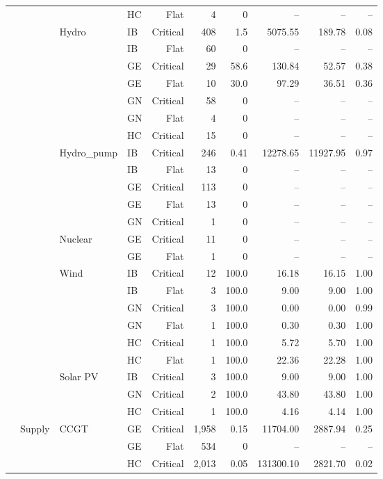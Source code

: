 \begin{longtable}{@{}l l l l r r r r r r@{}}
 &  &  & HC & Flat & 4 & 0 & -- & -- & -- \\
\addlinespace
 &  & Hydro & IB & Critical & 408 & 1.5 & 5075.55 & 189.78 & 0.08 \\
 &  &  & IB & Flat & 60 & 0 & -- & -- & -- \\
 &  &  & GE & Critical & 29 & 58.6 & 130.84 & 52.57 & 0.38 \\
 &  &  & GE & Flat & 10 & 30.0 & 97.29 & 36.51 & 0.36 \\
 &  &  & GN & Critical & 58 & 0 & -- & -- & -- \\
 &  &  & GN & Flat & 4 & 0 & -- & -- & -- \\
 &  &  & HC & Critical & 15 & 0 & -- & -- & -- \\
\addlinespace
 &  & Hydro\_pump & IB & Critical & 246 & 0.41 & 12278.65 & 11927.95 & 0.97 \\
 &  &  & IB & Flat & 13 & 0 & -- & -- & -- \\
 &  &  & GE & Critical & 113 & 0 & -- & -- & -- \\
 &  &  & GE & Flat & 13 & 0 & -- & -- & -- \\
 &  &  & GN & Critical & 1 & 0 & -- & -- & -- \\
\addlinespace
 &  & Nuclear & GE & Critical & 11 & 0 & -- & -- & -- \\
 &  &  & GE & Flat & 1 & 0 & -- & -- & -- \\
\addlinespace
 &  & Wind & IB & Critical & 12 & 100.0 & 16.18 & 16.15 & 1.00 \\
 &  &  & IB & Flat & 3 & 100.0 & 9.00 & 9.00 & 1.00 \\
 &  &  & GN & Critical & 3 & 100.0 & 0.00 & 0.00 & 0.99 \\
 &  &  & GN & Flat & 1 & 100.0 & 0.30 & 0.30 & 1.00 \\
 &  &  & HC & Critical & 1 & 100.0 & 5.72 & 5.70 & 1.00 \\
 &  &  & HC & Flat & 1 & 100.0 & 22.36 & 22.28 & 1.00 \\
\addlinespace
 &  & Solar PV & IB & Critical & 3 & 100.0 & 9.00 & 9.00 & 1.00 \\
 &  &  & GN & Critical & 2 & 100.0 & 43.80 & 43.80 & 1.00 \\
 &  &  & HC & Critical & 1 & 100.0 & 4.16 & 4.14 & 1.00 \\
\midrule
 & Supply & CCGT & GE & Critical & 1,958 & 0.15 & 11704.00 & 2887.94 & 0.25 \\
 &  &  & GE & Flat & 534 & 0 & -- & -- & -- \\
 &  &  & HC & Critical & 2,013 & 0.05 & 131300.10 & 2821.70 & 0.02 \\

\end{longtable}
